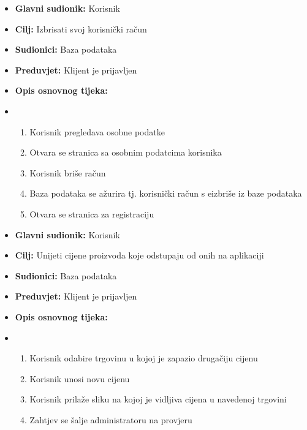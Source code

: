                         \noindent {}
					\begin{itemize}
	
						\item \textbf{Glavni sudionik: }Korisnik
						\item  \textbf{Cilj:} Izbrisati svoj korisnički račun
						\item  \textbf{Sudionici:} Baza podataka
						\item  \textbf{Preduvjet:} Klijent je prijavljen
						\item  \textbf{Opis osnovnog tijeka:}
						
						\item[] \begin{enumerate}
							\item Korisnik pregledava osobne podatke
                                \item Otvara se stranica sa osobnim podatcima korisnika
                                \item Korisnik briše račun
                                \item Baza podataka se ažurira tj. korisnički račun s eizbriše iz baze podataka
                                \item Otvara se stranica za registraciju\\
						\end{enumerate}
						
					\end{itemize}

                        \noindent {}
					\begin{itemize}
	
						\item \textbf{Glavni sudionik: }Korisnik
						\item  \textbf{Cilj:} Unijeti cijene proizvoda koje odstupaju od onih na aplikaciji
						\item  \textbf{Sudionici:} Baza podataka
						\item  \textbf{Preduvjet:} Klijent je prijavljen
						\item  \textbf{Opis osnovnog tijeka:}
						
						\item[] \begin{enumerate}
							\item Korisnik odabire trgovinu u kojoj je zapazio drugačiju cijenu
                                \item Korisnik unosi novu cijenu
                                \item Korisnik prilaže sliku na kojoj je vidljiva cijena u navedenoj trgovini
                                \item Zahtjev se šalje administratoru na provjeru\\
						\end{enumerate}
						
					\end{itemize}


